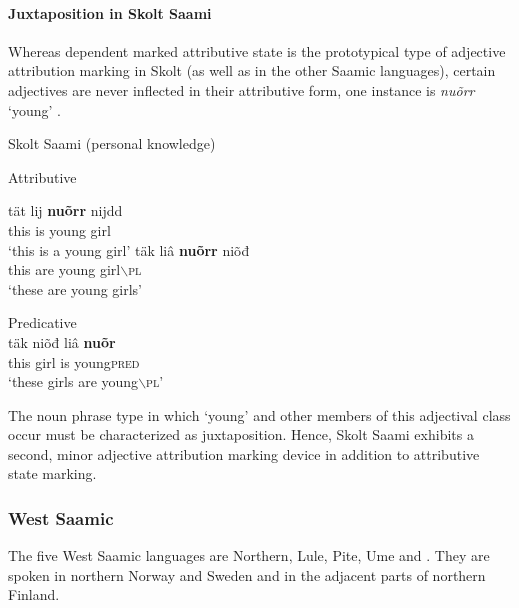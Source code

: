 \paragraph*{Juxtaposition in Skolt Saami}
Whereas dependent marked attributive state is the prototypical type of adjective attribution marking in Skolt (as well as in the other Saamic languages), certain adjectives are never inflected in their attributive form, one instance is \textit{nuõrr} ‘young’ \citep[cf. also][176]{feist2015a}.
\begin{exe}
\ex \rm{Skolt Saami (personal knowledge)}
\begin{xlist}
\ex \rm{Attributive}
\begin{xlist}
\gll 	tät lij \textbf{nuõrr} nijdd\\
	this is young girl\\
\glt	‘this is a young girl’
\ex	
\gll	täk liâ \textbf{nuõrr} niõđ\\
	this are young girl$\backslash$\textsc{pl}\\
\glt	‘these are young girls’
\end{xlist}
\ex \rm{Predicative}\\
\gll	täk niõđ liâ \textbf{nuõr}\\
	this girl is young\textsc{pred}\\
\glt	‘these girls are young$\backslash$\textsc{pl}’
\end{xlist}
\end{exe}
The noun phrase type in which ‘young’ and other members of this adjectival class occur must be characterized as {juxtaposition}. Hence, Skolt Saami exhibits a second, minor adjective attribution marking device in addition to attributive state marking.

\subsubsection{West Saamic}
The five West Saamic languages are Northern, Lule, Pite, Ume and . They are spoken in northern Norway and Sweden and in the adjacent parts of northern Finland.

